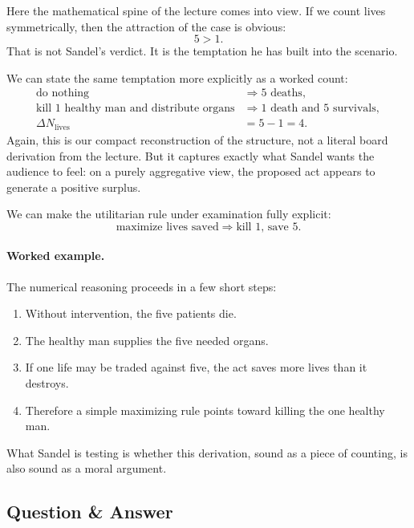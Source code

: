 Here the mathematical spine of the lecture comes into view. If we count lives symmetrically, then the attraction of the case is obvious:
\begin{equation}
5 > 1.
\end{equation}
That is not Sandel's verdict. It is the temptation he has built into the scenario.

We can state the same temptation more explicitly as a worked count:
\begin{align}
\text{do nothing} &\Longrightarrow 5 \text{ deaths},\\
\text{kill }1\text{ healthy man and distribute organs} &\Longrightarrow 1 \text{ death and }5 \text{ survivals},\\
\Delta N_{\text{lives}} &= 5 - 1 = 4.
\end{align}
Again, this is our compact reconstruction of the structure, not a literal board derivation from the lecture. But it captures exactly what Sandel wants the audience to feel: on a purely aggregative view, the proposed act appears to generate a positive surplus.

We can make the utilitarian rule under examination fully explicit:
\begin{equation}
\text{maximize lives saved}
\Longrightarrow
\text{kill }1\text{, save }5.
\end{equation}

\paragraph{Worked example.} The numerical reasoning proceeds in a few short steps:
\begin{enumerate}
\item Without intervention, the five patients die.
\item The healthy man supplies the five needed organs.
\item If one life may be traded against five, the act saves more lives than it destroys.
\item Therefore a simple maximizing rule points toward killing the one healthy man.
\end{enumerate}
What Sandel is testing is whether this derivation, sound as a piece of counting, is also sound as a moral argument.

\subsection{Question \& Answer}

